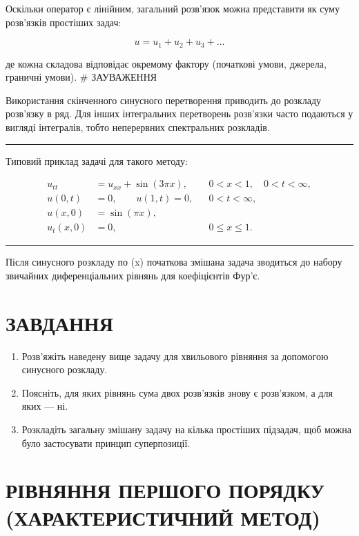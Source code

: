 \documentclass[
  ukrainian,
]{article}
\providecommand{\tightlist}{%
  \setlength{\itemsep}{0pt}\setlength{\parskip}{0pt}}
\begin{document}
Оскільки оператор є лінійним, загальний розв'язок можна представити як
суму розв'язків простіших задач:

\[
u = u_1 + u_2 + u_3 + \dots
\]

де кожна складова відповідає окремому фактору (початкові умови, джерела,
граничні умови). \# ЗАУВАЖЕННЯ

Використання скінченного синусного перетворення приводить до розкладу
розв'язку в ряд. Для інших інтегральних перетворень розв'язки часто
подаються у вигляді інтегралів, тобто неперервних спектральних
розкладів.

\begin{center}\rule{0.5\linewidth}{0.5pt}\end{center}

Типовий приклад задачі для такого методу:

\[
\begin{aligned}
u_{tt} &= u_{xx} + \sin(3\pi x), && 0 < x < 1,\quad 0 < t < \infty, \\
u(0,t) &= 0,\qquad u(1,t) = 0, && 0 < t < \infty, \\
u(x,0) &= \sin(\pi x), \\
u_t(x,0) &= 0, && 0 \le x \le 1.
\end{aligned}
\]

\begin{center}\rule{0.5\linewidth}{0.5pt}\end{center}

Після синусного розкладу по (x) початкова змішана задача зводиться до
набору звичайних диференціальних рівнянь для коефіцієнтів Фур'є.

\section{ЗАВДАННЯ}\label{ux437ux430ux432ux434ux430ux43dux43dux44f-17}

\begin{enumerate}
\def\labelenumi{\arabic{enumi}.}
\tightlist
\item
  Розв'яжіть наведену вище задачу для хвильового рівняння за допомогою
  синусного розкладу.
\item
  Поясніть, для яких рівнянь сума двох розв'язків знову є розв'язком, а
  для яких --- ні.
\item
  Розкладіть загальну змішану задачу на кілька простіших підзадач, щоб
  можна було застосувати принцип суперпозиції.
\end{enumerate}

\section{РІВНЯННЯ ПЕРШОГО ПОРЯДКУ (ХАРАКТЕРИСТИЧНИЙ
МЕТОД)}\label{ux440ux456ux432ux43dux44fux43dux43dux44f-ux43fux435ux440ux448ux43eux433ux43e-ux43fux43eux440ux44fux434ux43aux443-ux445ux430ux440ux430ux43aux442ux435ux440ux438ux441ux442ux438ux447ux43dux438ux439-ux43cux435ux442ux43eux434}
\end{document}
